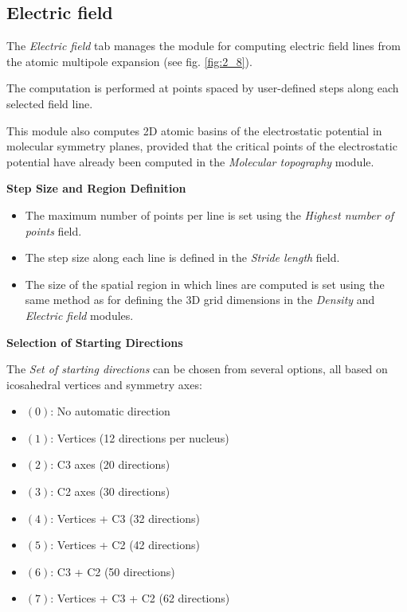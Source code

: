 \documentclass[10pt]{article}
\begin{document}


\subsection{Electric field \label{sec:2.8}}

The {\it Electric field} tab manages the module for computing electric field lines
from the atomic multipole expansion (see fig. \ref{fig:2_8}).

The computation is performed at points spaced by user-defined steps
along each selected field line.

This module also computes 2D atomic basins
of the electrostatic potential in molecular symmetry planes,
provided that the critical points of the electrostatic potential
have already been computed in the {\it Molecular topography} module.

\vspace*{3mm}
{\bf Step Size and Region Definition}
\vspace*{3mm}

\begin{itemize}
\item The maximum number of points per line is set using the {\it Highest number of points} field.
\item The step size along each line is defined in the {\it Stride length} field.
\item The size of the spatial region in which lines are computed is set
using the same method as for defining the 3D grid dimensions
in the {\it Density} and {\it Electric field} modules.
\end{itemize}

\vspace*{3mm}
{\bf Selection of Starting Directions}
\vspace*{3mm}

The {\it Set of starting directions} can be chosen
from several options, all based on icosahedral vertices and symmetry axes:

\begin{itemize}
\item $(0)$: No automatic direction
\item $(1)$: Vertices (12 directions per nucleus)
\item $(2)$: C3 axes (20 directions)
\item $(3)$: C2 axes (30 directions)
\item $(4)$: Vertices + C3 (32 directions)
\item $(5)$: Vertices + C2 (42 directions)
\item $(6)$: C3 + C2 (50 directions)
\item $(7)$: Vertices + C3 + C2 (62 directions)
\end{itemize}
\end{document}
